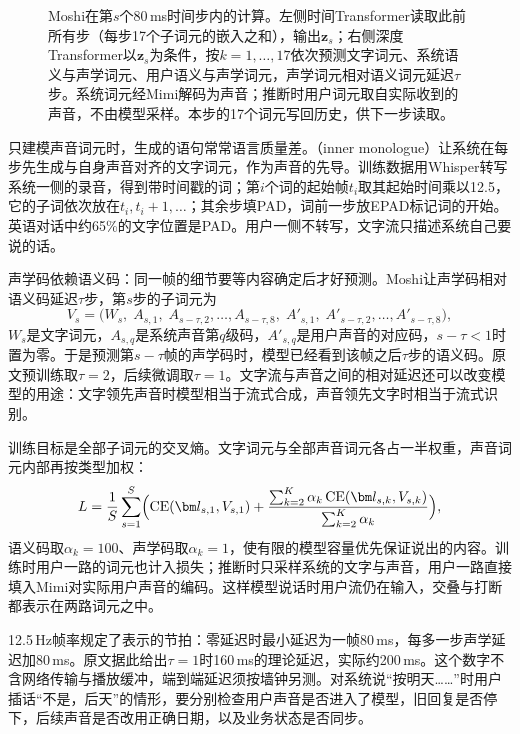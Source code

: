 \begin{figure}[htbp]
  \centering
  
  \caption{Moshi在第$s$个80\,ms时间步内的计算。左侧时间Transformer读取此前所有步（每步17个子词元的嵌入之和），输出$\bm z_s$；右侧深度Transformer以$\bm z_s$为条件，按$k=1,\ldots,17$依次预测文字词元、系统语义与声学词元、用户语义与声学词元，声学词元相对语义词元延迟$\tau$步。系统词元经Mimi解码为声音；推断时用户词元取自实际收到的声音，不由模型采样。本步的17个词元写回历史，供下一步读取。}
  \label{fig:nlp-speech-moshi-rq}
\end{figure}

只建模声音词元时，生成的语句常常语言质量差。（inner monologue）让系统在每步先生成与自身声音对齐的文字词元，作为声音的先导。训练数据用Whisper转写系统一侧的录音，得到带时间戳的词；第$i$个词的起始帧$t_i$取其起始时间乘以12.5，它的子词依次放在$t_i,t_i+1,\ldots$；其余步填PAD，词前一步放EPAD标记词的开始。英语对话中约65\%的文字位置是PAD。用户一侧不转写，文字流只描述系统自己要说的话。

声学码依赖语义码：同一帧的细节要等内容确定后才好预测。Moshi让声学码相对语义码延迟$\tau$步，第$s$步的子词元为
\begin{equation}
 V_{s}=\bigl(W_s,\;A_{s,1},\;A_{s-\tau,2},\ldots,A_{s-\tau,8},\;A'_{s,1},\;A'_{s-\tau,2},\ldots,A'_{s-\tau,8}\bigr),
 \label{eq:nlp-speech-moshi-delay}
\end{equation}
$W_s$是文字词元，$A_{s,q}$是系统声音第$q$级码，$A'_{s,q}$是用户声音的对应码，$s-\tau<1$时置为零。于是预测第$s-\tau$帧的声学码时，模型已经看到该帧之后$\tau$步的语义码。原文预训练取$\tau=2$，后续微调取$\tau=1$。文字流与声音之间的相对延迟还可以改变模型的用途：文字领先声音时模型相当于流式合成，声音领先文字时相当于流式识别。

训练目标是全部子词元的交叉熵。文字词元与全部声音词元各占一半权重，声音词元内部再按类型加权：
\[
 L=\frac1S\sum_{s=1}^{S}\Bigl(\operatorname{CE}(\bm l_{s,1},V_{s,1})+\frac{\sum_{k=2}^{K}\alpha_k\operatorname{CE}(\bm l_{s,k},V_{s,k})}{\sum_{k=2}^{K}\alpha_k}\Bigr),
\]
语义码取$\alpha_k=100$、声学码取$\alpha_k=1$，使有限的模型容量优先保证说出的内容。训练时用户一路的词元也计入损失；推断时只采样系统的文字与声音，用户一路直接填入Mimi对实际用户声音的编码。这样模型说话时用户流仍在输入，交叠与打断都表示在两路词元之中。

12.5\,Hz帧率规定了表示的节拍：零延迟时最小延迟为一帧80\,ms，每多一步声学延迟加80\,ms。原文据此给出$\tau=1$时160\,ms的理论延迟，实际约200\,ms。这个数字不含网络传输与播放缓冲，端到端延迟须按墙钟另测。对系统说“按明天……”时用户插话“不是，后天”的情形，要分别检查用户声音是否进入了模型，旧回复是否停下，后续声音是否改用正确日期，以及业务状态是否同步。

